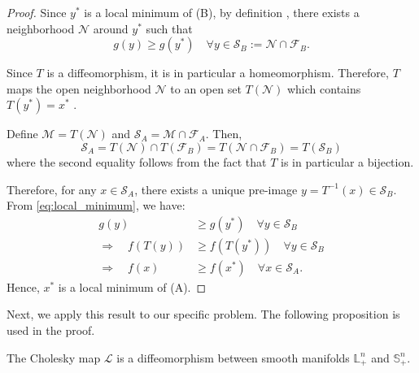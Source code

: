\documentclass{IEEEtran}
\begin{document}
\begin{proof}
Since $y^*$ is a local minimum of (B), by definition \cite[Chapter 12]{nocedalNumericalOptimization2006}, there exists a neighborhood $\mathcal{N}$ around $y^*$ such that
\begin{equation}
\label{eq:local_minimum}
g(y) \geq g(y^*) \quad \forall y \in \mathcal{S}_B := \mathcal{N} \cap \mathcal{F}_B.
\end{equation}

Since $T$ is a diffeomorphism, it is in particular a homeomorphism. Therefore, $T$ maps the open neighborhood $\mathcal{N}$ to an open set $T(\mathcal{N})$ which contains $T(y^*) = x^*$ \cite[Chapter 12]{munkresTopology2014}.

Define $\mathcal{M} = T(\mathcal{N})$ and $\mathcal{S}_A = \mathcal{M} \cap \mathcal{F}_A$. Then,
\begin{equation}
\mathcal{S}_A = T(\mathcal{N}) \cap T(\mathcal{F}_B) 
= T(\mathcal{N} \cap \mathcal{F}_B) 
= T(\mathcal{S}_B)
\end{equation}
where the second equality follows from the fact that $T$ is in particular a bijection.

Therefore, for any $x \in \mathcal{S}_A$, there exists a unique pre-image $y = T^{-1}(x) \in \mathcal{S}_B$. From \eqref{eq:local_minimum}, we have:
\begin{align}
g(y) &\geq g(y^*) \quad \forall y \in \mathcal{S}_B \nonumber \\
\Rightarrow \quad f(T(y)) &\geq f(T(y^*)) \quad \forall y \in \mathcal{S}_B \nonumber \\
\Rightarrow \quad f(x) &\geq f(x^*) \quad \forall x \in \mathcal{S}_A. \label{eq:local_optimality_x}
\end{align}
Hence, \(x^*\) is a local minimum of (A).
\end{proof}

Next, we apply this result to our specific problem. The following proposition is used in the proof.
\begin{proposition}
	\label{prop:cholesky_diffeomorphism}
	The Cholesky map \(\mathcal{L}\) is a diffeomorphism between smooth manifolds \(\mathbb{L}_+^n\) and \(\mathbb{S}^n_+\).
\end{proposition}
\end{document}

